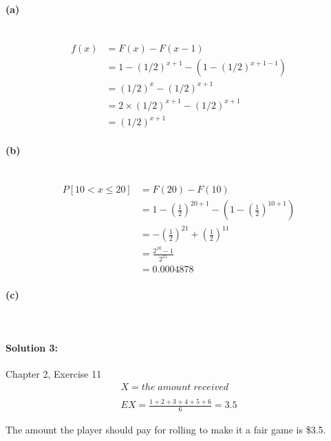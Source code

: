 \documentclass[a4paper]{article}
\begin{document}
\paragraph{(a)} ~\\
\begin{align*}
f(x) &= F(x) - F(x-1)\\
     &= 1-(1/2)^{x+1} - \left(1-(1/2)^{x+1-1}\right)\\
     &= (1/2)^{x} - (1/2)^{x+1}\\
     &= 2 \times (1/2)^{x+1} - (1/2)^{x+1}\\
     &= (1/2)^{x+1}
\end{align*}

\paragraph{(b)} ~\\
\begin{align*}
P[10<x \leq 20] &= F(20) - F(10) \\
				&= 1 - \left(\frac{1}{2}\right)^{20+1} - \left(1-\left(\frac{1}{2}\right)^{10+1}\right)\\
				&= - \left(\frac{1}{2}\right)^{21} + \left(\frac{1}{2}\right)^{11}\\
				&= \frac{2^{10}-1}{2^{21}}\\
				&= 0.0004878
\end{align*}
\paragraph{(c)} ~\\
\vspace{3 cm}

\paragraph{Solution 3:}
Chapter 2, Exercise 11
\begin{align*}
X = the \; amount \; received\\
\\
EX = \frac{1+2+3+4+5+6}{6} = 3.5
\end{align*}

The amount the player should pay for rolling to make it a fair game is \$3.5.
\end{document}
